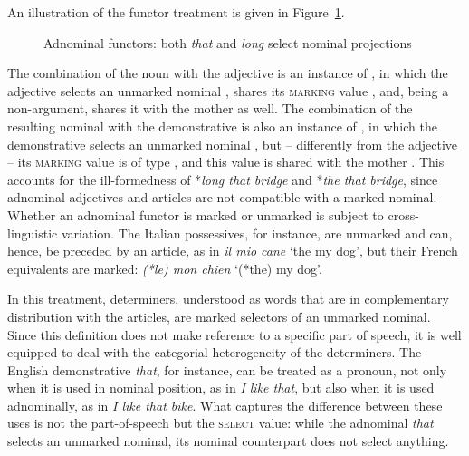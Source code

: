 \documentclass[output=paper
                ,modfonts
                ,nonflat
	        ,collection
	        ,collectionchapter
	        ,collectiontoclongg
 	        ,biblatex
                ,babelshorthands
                ,newtxmath
                ,draftmode
                ,colorlinks, citecolor=brown
]{./langsci/langscibook}
\begin{document}
An illustration of the functor treatment is given in Figure~\ref{markyy}.
\begin{figure}
\centering
{}
\caption{\label{markyy} Adnominal functors: both \emph{that} and \emph{long} select nominal projections}
\end{figure}
The combination of the noun with the adjective is an instance of , 
in which the adjective selects an unmarked nominal ,  
shares its \textsc{marking} value , and, being a non-argument, 
shares it with the mother as well. 
The combination of the resulting nominal with the demonstrative is also 
an instance of ,
in which the demonstrative selects an unmarked nominal , 
but -- differently from the adjective -- its \textsc{marking} value is of type 
, and this value is shared with the mother .    
This accounts for the ill-formedness of 
*\emph{long that bridge} and *\emph{the that bridge}, since 
adnominal adjectives and articles are not compatible with a marked nominal.  
Whether an adnominal functor is marked or unmarked is subject to cross-linguistic variation. 
The Italian possessives, for instance, are unmarked and can, hence, be preceded 
by an article, as in \emph{il mio cane} `the my dog', but   
their French equivalents are marked: \emph{(*le) mon chien} `(*the) my dog'. 

In this treatment, determiners, understood as words that are in complementary distribution with 
the articles, are marked selectors of an unmarked nominal. Since this definition does not 
make reference to a specific part of speech, it is well equipped to deal with the categorial 
heterogeneity of the determiners. The English demonstrative \emph{that}, for instance, 
can be treated as a pronoun, not only when it is used in nominal position, as in 
\emph{I like that}, but also when it is used adnominally, as in \emph{I like that bike}.   
What captures the difference between these uses is not the part-of-speech but  
the \textsc{select} value: while the adnominal \emph{that} selects an unmarked nominal, 
its nominal counterpart does not select anything.      
\end{document}
